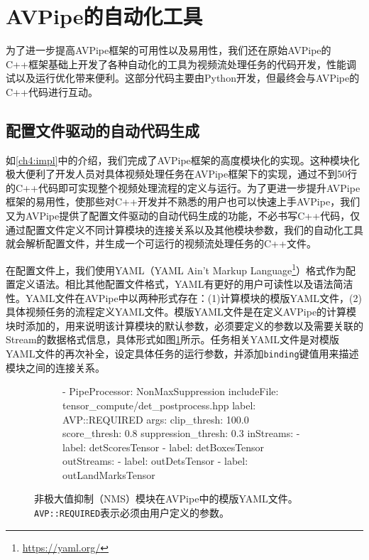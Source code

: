 \section{AVPipe的自动化工具}
为了进一步提高AVPipe框架的可用性以及易用性，我们还在原始AVPipe的C++框架基础上开发了各种自动化的工具为视频流处理任务的代码开发，性能调试以及运行优化带来便利。这部分代码主要由Python开发，但最终会与AVPipe的C++代码进行互动。
\subsection{配置文件驱动的自动代码生成}\label{ch4:auto_codegen}
如\ref{ch4:impl}中的介绍，我们完成了AVPipe框架的高度模块化的实现。这种模块化极大便利了开发人员对具体视频处理任务在AVPipe框架下的实现，通过不到50行的C++代码即可实现整个视频处理流程的定义与运行。为了更进一步提升AVPipe框架的易用性，使那些对C++开发并不熟悉的用户也可以快速上手AVPipe，我们又为AVPipe提供了配置文件驱动的自动代码生成的功能，不必书写C++代码，仅通过配置文件定义不同计算模块的连接关系以及其他模块参数，我们的自动化工具就会解析配置文件，并生成一个可运行的视频流处理任务的C++文件。\par
在配置文件上，我们使用YAML（YAML Ain't Markup Language\footnote{\url{https://yaml.org/}}）格式作为配置定义语法。相比其他配置文件格式，YAML有更好的用户可读性以及语法简洁性。YAML文件在AVPipe中以两种形式存在：(1)计算模块的模版YAML文件，(2)具体视频任务的流程定义YAML文件。模版YAML文件是在定义AVPipe的计算模块时添加的，用来说明该计算模块的默认参数，必须要定义的参数以及需要关联的Stream的数据格式信息，具体形式如图\ref{fig:yaml}所示。任务相关YAML文件是对模版YAML文件的再次补全，设定具体任务的运行参数，并添加\texttt{binding}键值用来描述模块之间的连接关系。\par

\begin{figure}[!htp]
  \centering
  \begin{subfigure}{0.7\textwidth}
    \centering
    
\begin{codeblock}[language=Ruby, basicstyle=\ttfamily\small]
- PipeProcessor: NonMaxSuppression
  includeFile: tensor_compute/det_postprocess.hpp
  label: AVP::REQUIRED
  args:
    clip_thresh: 100.0
    score_thresh: 0.8
    suppression_thresh: 0.3
  inStreams:
  - label: detScoresTensor
  - label: detBoxesTensor
  outStreams:
  - label: outDetsTensor
  - label: outLandMarksTensor
\end{codeblock}
  \end{subfigure}
  
  \caption[AVPipe计算模块的模版YAML文件]{非极大值抑制（NMS）模块在AVPipe中的模版YAML文件。\texttt{AVP::REQUIRED}表示必须由用户定义的参数。}
  \label{fig:yaml}
\end{figure}

